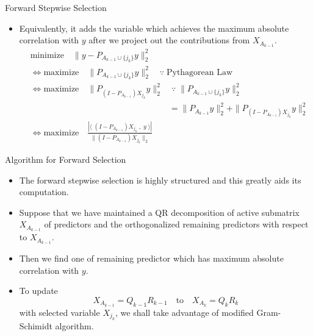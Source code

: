 \documentclass[blue, 10pt]{beamer}
\begin{document}
\begin{frame}{Forward Stepwise Selection}

\begin{itemize}
  \item Equivalently, it adds the variable which achieves the maximum absolute correlation with $y$ after we project out the contributions from $X_{A_{k-1}}$.
  \begin{align*}
    &\text{minimize}\quad \|y-P_{A_{k-1}\cup \{j_k\}} y\|_2^2 \\
    &\Leftrightarrow \text{maximize} \quad \|P_{A_{k-1}\cup \{j_k\}}y\|_2^2 \quad \because \; \text{Pythagorean Law}\\
    &\Leftrightarrow \text{maximize} \quad \|P_{(I-P_{A_{k-1}})X_{j_k}}y\|_2^2 \quad \because \; \|P_{A_{k-1}\cup \{j_k\}}y\|_2^2  \\
    &~\qquad\qquad\qquad\qquad\qquad\qquad\qquad\qquad = \|P_{A_{k-1}}y\|_2^2 +  \|P_{(I-P_{A_{k-1}})X_{j_k}}y\|_2^2 \\
    &\Leftrightarrow \text{maximize} \quad \frac{|\langle\; (I-P_{A_{k-1}})X_{j_k}\;,\; y \;\rangle|}{\|(I-P_{A_{k-1}})X_{j_k} \|_2}
  \end{align*}
\end{itemize}

\end{frame}


\begin{frame}{Algorithm for Forward Selection}

\begin{itemize}
  \item The forward stepwise selection is highly structured and this greatly aids its computation.
  \item Suppose that we have maintained a QR decomposition of active  submatrix $X_{A_{k-1}}$ of predictors and the orthogonalized remaining predictors with respect to $X_{A_{k-1}}$.
  \item Then we find one of remaining predictor which has maximum absolute correlation with $y$. 
  \item To update $$X_{A_{k-1}}=Q_{k-1}R_{k-1} \quad \text{to}\quad X_{A_k} = Q_{k}R_{k}$$ with selected variable $X_{j_k}$, we shall take advantage of modified Gram-Schimidt algorithm. 
\end{itemize}

\end{frame}
\end{document}

